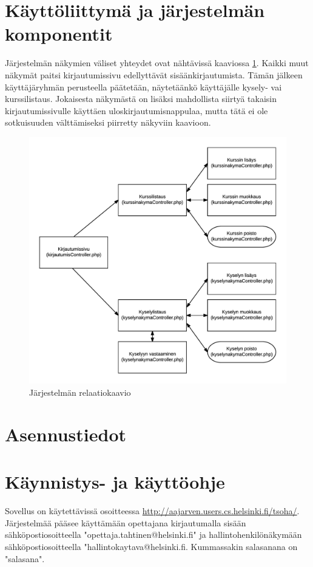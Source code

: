 \documentclass[12pt,a4paper,titlepage]{article}
\begin{document}
\section{Käyttöliittymä ja järjestelmän komponentit}
Järjestelmän näkymien väliset yhteydet ovat nähtävissä kaaviossa \ref{fig:komponentit}. Kaikki muut näkymät paitsi kirjautumissivu edellyttävät sisäänkirjautumista. Tämän jälkeen käyttäjäryhmän perusteella päätetään, näytetäänkö käyttäjälle kysely- vai kurssilistaus. Jokaisesta näkymästä on lisäksi mahdollista siirtyä takaisin kirjautumissivulle käyttäen uloskirjautumisnappulaa, mutta tätä ei ole sotkuisuuden välttämiseksi piirretty näkyviin kaavioon.

\begin{figure}
   \centering
   \includegraphics[width=\textwidth]{kuvat/komponenttirakenne.png}
   \caption{Järjestelmän relaatiokaavio}\label{fig:komponentit}
\end{figure}

\section{Asennustiedot}

\section{Käynnistys- ja käyttöohje}
Sovellus on käytettävissä osoitteessa \url{http://aajarven.users.cs.helsinki.fi/tsoha/}. Järjestelmää pääsee käyttämään opettajana kirjautumalla sisään sähköpostiosoitteella "opettaja.tahtinen@helsinki.fi" ja hallintohenkilönäkymään sähköpostiosoitteella "hallintokaytava@helsinki.fi. Kummassakin salasanana on "salasana". 



\small

\end{document}
